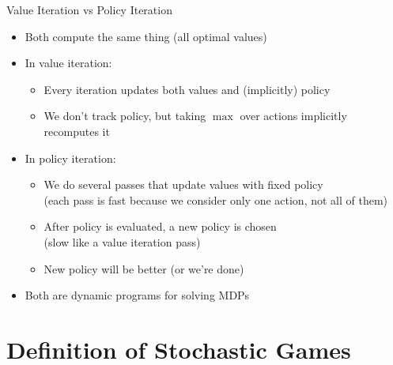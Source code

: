 \documentclass[11pt,aspectratio=169,handout]{beamer}
\begin{document}
  
  \begin{frame}{Value Iteration vs Policy Iteration}
   \begin{itemize}[<+->]
   \setlength{\itemsep}{1em}
    \item Both compute the same thing (all optimal values)
    \item In \alert{value iteration:}
    \begin{itemize}
     \item Every iteration updates both values and (implicitly) policy
     \item We don't track policy, but taking $\max$ over actions implicitly recomputes it
    \end{itemize}
    \item In \alert{policy iteration:}
    \begin{itemize}
     \item We do several passes that update values with fixed policy\\(each pass is fast because we consider only one action, not all of them)
     \item After policy is evaluated, a new policy is chosen\\(slow like a value iteration pass)
     \item New policy will be better (or we're done)
    \end{itemize}
    \item Both are \alert{dynamic programs} for solving MDPs
   \end{itemize}
  \end{frame}
  
  
 \section{Definition of Stochastic Games}
 
\end{document}
